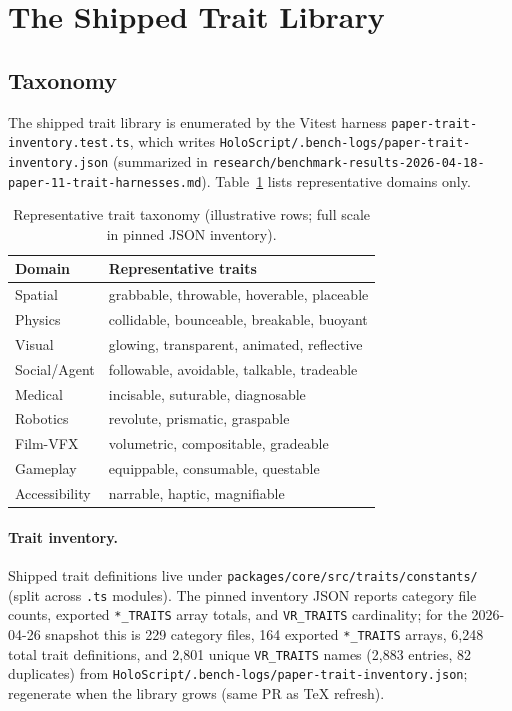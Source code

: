 \documentclass[sigconf,nonacm]{acmart}
\begin{document}
\section{The Shipped Trait Library}
\label{sec:library}

\subsection{Taxonomy}

The shipped trait library is enumerated by the Vitest harness
\texttt{paper-trait-inventory.test.ts}, which writes
\texttt{HoloScript/.bench-logs/paper-trait-inventory.json}
(summarized in \texttt{research/benchmark-results-2026-04-18-paper-11-trait-harnesses.md}).
Table~\ref{tab:traits} lists representative domains only.

\begin{table}[t]
\centering
\caption{Representative trait taxonomy (illustrative rows; full scale in pinned JSON inventory).}
\label{tab:traits}
\begin{tabular}{@{}ll@{}}
\toprule
Domain & Representative traits \\
\midrule
Spatial       & grabbable, throwable, hoverable, placeable \\
Physics       & collidable, bounceable, breakable, buoyant \\
Visual        & glowing, transparent, animated, reflective \\
Social/Agent  & followable, avoidable, talkable, tradeable \\
Medical       & incisable, suturable, diagnosable \\
Robotics      & revolute, prismatic, graspable \\
Film-VFX      & volumetric, compositable, gradeable \\
Gameplay      & equippable, consumable, questable \\
Accessibility & narrable, haptic, magnifiable \\
\bottomrule
\end{tabular}
\end{table}

\paragraph{Trait inventory.}
Shipped trait definitions live under
\texttt{packages/core/src/traits/constants/} (split across
\texttt{.ts} modules). The pinned inventory JSON reports category file counts,
exported \texttt{*\_TRAITS} array totals, and \texttt{VR\_TRAITS} cardinality;
for the 2026-04-26 snapshot this is 229 category files, 164 exported
\texttt{*\_TRAITS} arrays, 6{,}248 total trait definitions, and 2{,}801 unique
\texttt{VR\_TRAITS} names (2{,}883 entries, 82 duplicates)
from \texttt{HoloScript/.bench-logs/paper-trait-inventory.json}; regenerate
when the library grows (same PR as TeX refresh).
\end{document}
